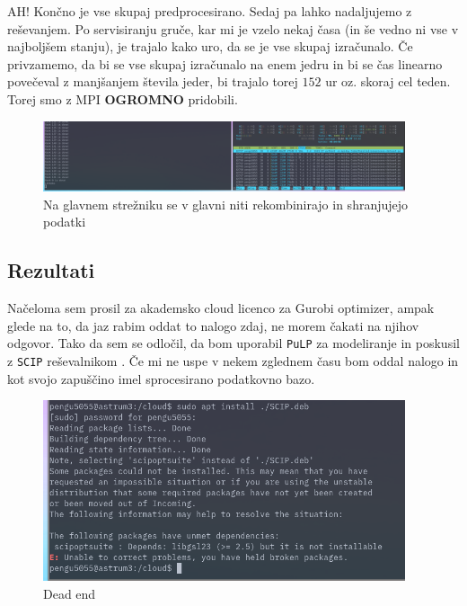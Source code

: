 \documentclass[a4paper]{article}
\begin{document}
AH! Končno je vse skupaj predprocesirano. Sedaj pa lahko nadaljujemo z reševanjem. Po servisiranju gruče, kar mi je vzelo 
nekaj časa (in še vedno ni vse v najboljšem stanju), je trajalo kako uro, da se je vse skupaj izračunalo. Če privzamemo, da
bi se vse skupaj izračunalo na enem jedru in bi se čas linearno povečeval z manjšanjem števila jeder, bi trajalo torej $152$ ur 
oz. skoraj cel teden. Torej smo z MPI \textbf{OGROMNO} pridobili. \\

\begin{figure}
    \centering
    \includegraphics[width=0.95\textwidth]{./1h-later.png}
    \caption{Na glavnem strežniku se v glavni niti rekombinirajo in shranjujejo podatki}
    \label{fig:later}
\end{figure}

\subsection{Rezultati}
Načeloma sem prosil za akademsko cloud licenco za Gurobi optimizer, ampak glede na to, da jaz rabim oddat to nalogo zdaj, 
ne morem čakati na njihov odgovor. Tako da sem se odločil, da bom uporabil \texttt{PuLP} za modeliranje in poskusil z 
\texttt{SCIP} reševalnikom \cite{MaherMiltenbergerPedrosoRehfeldtSchwarzSerrano2016}. Če mi ne uspe v nekem zglednem času 
bom oddal nalogo in kot svojo zapuščino imel sprocesirano podatkovno bazo. \\

\begin{figure}
    \centering
    \includegraphics[width=0.95\textwidth]{./end.png}
    \caption{Dead end}
    \label{fig:scip}
\end{figure}
\end{document}
